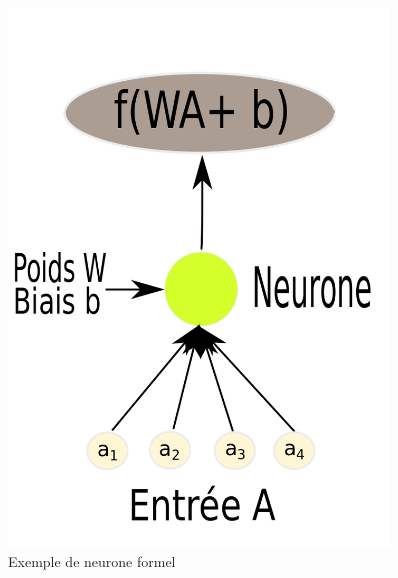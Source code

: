 \documentclass[a4paper, 11pt, onecolumn]{article}
\begin{document}
\begin{figure}[!tbp]
\centering  
  \begin{minipage}[b]{0.3\textwidth}
    \includegraphics[width=0.9\textwidth]{Neuron}
    \caption{Exemple de neurone formel}
  \end{minipage}
  \hfill
  \begin{minipage}[b]{0.3\textwidth}

\end{minipage}
\end{figure}
\end{document}

